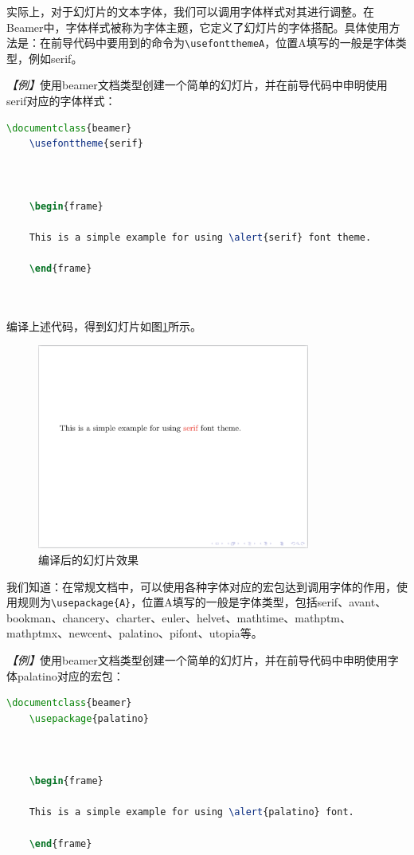 实际上，对于幻灯片的文本字体，我们可以调用字体样式对其进行调整。在Beamer中，字体样式被称为字体主题，它定义了幻灯片的字体搭配。具体使用方法是：在前导代码中要用到的命令为\texttt{\textbackslash{}usefonttheme{A}}，位置A填写的一般是字体类型，例如serif。

\emph{【例】}使用beamer文档类型创建一个简单的幻灯片，并在前导代码中申明使用serif对应的字体样式：
\begin{lstlisting}[language=TeX]
    \documentclass{beamer}
    \usefonttheme{serif}

    

    \begin{frame}

    This is a simple example for using \alert{serif} font theme.

    \end{frame}

    
\end{lstlisting}

编译上述代码，得到幻灯片如图\ref{fig:928}所示。

\begin{figure}[htbp]
    \centering
    \includegraphics[width = 0.8\textwidth]{images/ch_9/example_sec2_3.png}
    \caption{编译后的幻灯片效果}
    \label{fig:928}
\end{figure}

我们知道：在常规文档中，可以使用各种字体对应的宏包达到调用字体的作用，使用规则为\texttt{\textbackslash{}usepackage\{A\}}，位置A填写的一般是字体类型，包括serif、avant、bookman、chancery、charter、euler、helvet、mathtime、mathptm、mathptmx、newcent、palatino、pifont、utopia等。

\emph{【例】}使用beamer文档类型创建一个简单的幻灯片，并在前导代码中申明使用字体palatino对应的宏包：
\begin{lstlisting}[language=TeX]
    \documentclass{beamer}
    \usepackage{palatino}

    

    \begin{frame}

    This is a simple example for using \alert{palatino} font.

    \end{frame}

    
\end{lstlisting}

